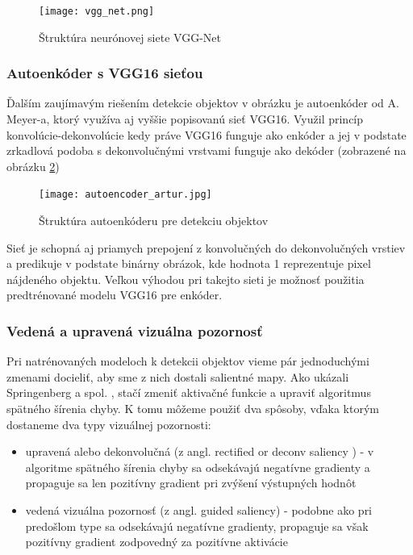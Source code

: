 \begin{figure}[H]
	\texttt{[image: vgg\_net.png]}
	\caption[VGG16]{Štruktúra neurónovej siete VGG-Net\footnotemark}\label{vgg_net_model}
\end{figure}


\subsubsection{Autoenkóder s VGG16 sieťou}

Ďalším zaujímavým riešením detekcie objektov v obrázku je autoenkóder od A. Meyer-a\cite{autoencoder_artur}, ktorý využíva aj vyššie popisovanú sieť VGG16. Využil princíp konvolúcie-dekonvolúcie kedy práve VGG16 funguje ako enkóder a jej v podstate zrkadlová podoba s dekonvolučnými vrstvami funguje ako dekóder (zobrazené na obrázku \ref{autoencoder_artur_graph})

\begin{figure}[H]
\centering	\texttt{[image: autoencoder\_artur.jpg]}
	\caption[Autoenkóder pre detekciu objektov]{Štruktúra autoenkóderu pre detekciu objektov\footnotemark}\label{autoencoder_artur_graph}
\end{figure}


Sieť je schopná aj priamych prepojení z konvolučných do dekonvolučných vrstiev a predikuje v podstate binárny obrázok, kde hodnota 1 reprezentuje pixel nájdeného objektu. Veľkou výhodou pri takejto sieti je možnosť použitia predtrénované modelu VGG16 pre enkóder. 

\subsubsection{Vedená a upravená vizuálna pozornosť}
\label{relu_and_guided_saliency}
Pri natrénovaných modeloch k detekcii objektov vieme pár jednoduchými zmenami docieliť, aby sme z nich dostali salientné mapy. Ako ukázali Springenberg a spol. \cite{springenberg2014striving}, stačí zmeniť aktivačné funkcie a upraviť algoritmus spätného šírenia chyby. K tomu môžeme použiť dva spôsoby, vďaka ktorým dostaneme dva typy vizuálnej pozornosti:

\begin{itemize}
	\item upravená alebo dekonvolučná (z angl.  rectified or deconv saliency \cite{zeiler2014visualizing}) - v algoritme spätného šírenia chyby sa odsekávajú negatívne gradienty a propaguje sa len pozitívny gradient pri zvýšení výstupných hodnôt
	\item vedená vizuálna pozornosť (z angl. guided saliency) - podobne ako pri predošlom type sa odsekávajú negatívne gradienty, propaguje sa však pozitívny gradient zodpovedný za pozitívne aktivácie
\end{itemize}

